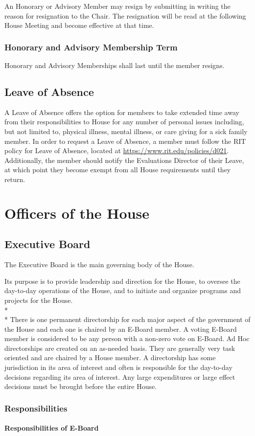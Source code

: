 \documentclass{article}
\newcommand{\article}[1]{\section{#1} \label{#1}}
\newcommand{\asection}[1]{\subsection{#1} \label{#1}}
\newcommand{\asubsection}[1]{\subsubsection{#1} \label{#1}}
\newcommand{\asubsubsection}[1]{\paragraph{#1} \label{#1}}
\begin{document}
An Honorary or Advisory Member may resign by submitting in writing the reason for resignation to the Chair.
The resignation will be read at the following House Meeting and become effective at that time.
\asubsection{Honorary and Advisory Membership Term}
Honorary and Advisory Memberships shall last until the member resigns.

\asection{Leave of Absence}
A Leave of Absence offers the option for members to take extended time away from their responsibilities to House for any number of personal issues including, but not limited to, physical illness, mental illness, or care giving for a sick family member. 
In order to request a Leave of Absence, a member must follow the RIT policy for Leave of Absence, located at \url{https://www.rit.edu/policies/d021}. Additionally, the member should notify the Evaluations Director of their Leave, at which point they become exempt from all House requirements until they return.

\article{Officers of the House}
\asection{Executive Board}
The Executive Board is the main governing body of the House.

Its purpose is to provide leadership and direction for the House, to oversee the day-to-day operations of the House, and to initiate and organize programs and projects for the House.
\\*\\*
There is one permanent directorship for each major aspect of the government of the House and each one is chaired by an E-Board member.
A voting E-Board member is considered to be any person with a non-zero vote on E-Board. %
Ad Hoc directorships are created on an as-needed basis.
They are generally very task oriented and are chaired by a House member.
A directorship has some jurisdiction in its area of interest and often is responsible for the day-to-day decisions regarding its area of interest.
Any large expenditures or large effect decisions must be brought before the entire House.

\asubsection{Responsibilities}

\renewcommand{\theenumi}{\alph{enumi}} %
\asubsubsection{Responsibilities of E-Board}
\end{document}
